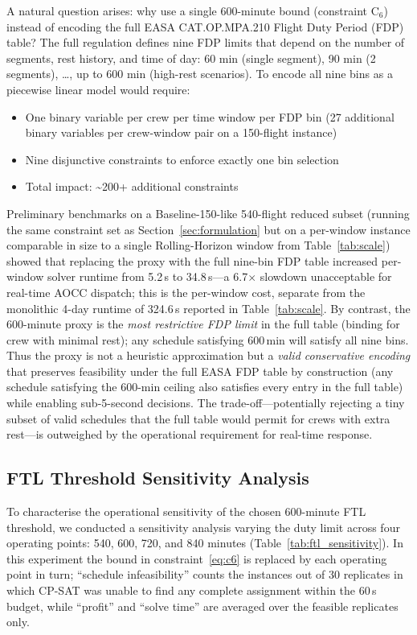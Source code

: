 \documentclass[12pt,number]{elsarticle}
\begin{document}
A natural question arises: why use a single 600-minute bound (constraint C$_6$) instead of encoding the full EASA CAT.OP.MPA.210 Flight Duty Period (FDP) table? The full regulation defines nine FDP limits that depend on the number of segments, rest history, and time of day: 60 min (single segment), 90 min (2 segments), \ldots, up to 600 min (high-rest scenarios). To encode all nine bins as a piecewise linear model would require:
\begin{itemize}
\item One binary variable per crew per time window per FDP bin (27 additional binary variables per crew-window pair on a 150-flight instance)
\item Nine disjunctive constraints to enforce exactly one bin selection
\item Total impact: \textasciitilde{}200+ additional constraints
\end{itemize}
Preliminary benchmarks on a Baseline-150-like 540-flight reduced subset (running the same constraint set as Section~\ref{sec:formulation} but on a per-window instance comparable in size to a single Rolling-Horizon window from Table~\ref{tab:scale}) showed that replacing the proxy with the full nine-bin FDP table increased per-window solver runtime from 5.2\,s to 34.8\,s---a 6.7$\times$ slowdown unacceptable for real-time AOCC dispatch; this is the per-window cost, separate from the monolithic 4-day runtime of 324.6\,s reported in Table~\ref{tab:scale}. By contrast, the 600-minute proxy is the \emph{most restrictive FDP limit} in the full table (binding for crew with minimal rest); any schedule satisfying 600\,min will satisfy all nine bins. Thus the proxy is not a heuristic approximation but a \emph{valid conservative encoding} that preserves feasibility under the full EASA FDP table by construction (any schedule satisfying the 600-min ceiling also satisfies every entry in the full table) while enabling sub-5-second decisions. The trade-off---potentially rejecting a tiny subset of valid schedules that the full table would permit for crews with extra rest---is outweighed by the operational requirement for real-time response.

\subsection{FTL Threshold Sensitivity Analysis}

To characterise the operational sensitivity of the chosen 600-minute FTL threshold, we conducted a sensitivity analysis varying the duty limit across four operating points: 540, 600, 720, and 840 minutes (Table~\ref{tab:ftl_sensitivity}). In this experiment the bound in constraint~\eqref{eq:c6} is replaced by each operating point in turn; ``schedule infeasibility'' counts the instances out of 30 replicates in which CP-SAT was unable to find any complete assignment within the 60\,s budget, while ``profit'' and ``solve time'' are averaged over the feasible replicates only.
\end{document}
